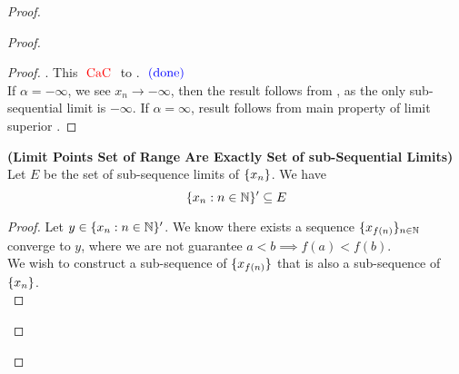 \documentclass{report}
\begin{document}
\begin{proof}
\begin{proof}
\begin{proof}
. This $\text{ \textcolor{red}{CaC} }$ to . $\textcolor{blue}{\text{ (done) }}$\\

If $\alpha =-\infty$, we see $x_n\to -\infty$, then the result follows from , as the only sub-sequential limit is $-\infty$. If $\alpha =\infty$, result follows from main property of limit superior .
\end{proof}
\begin{theorem}
\label{4.4.11}
\textbf{(Limit Points Set of Range Are Exactly Set of sub-Sequential Limits)} Let $E$ be the set of sub-sequence limits of  $\{ x_n \}$. We have
\begin{equation}
\{ x_n:n\in\mathbb{N} \}'\subseteq E
\end{equation}
\end{theorem}
\begin{proof}
Let $y\in \{ x_n:n\in\mathbb{N} \}'$. We know there exists a sequence $\{ x_{f(n)} \}_{n\in\mathbb{N}}$ converge to $y$, where we are not guarantee $a<b\implies f(a)<f(b)$.\\

We wish to construct a sub-sequence of $\{ x_{f(n)} \}$ that is also a sub-sequence of $\{ x_n \}$.\\


\end{proof}
\end{proof}
\end{proof}
\end{document}
